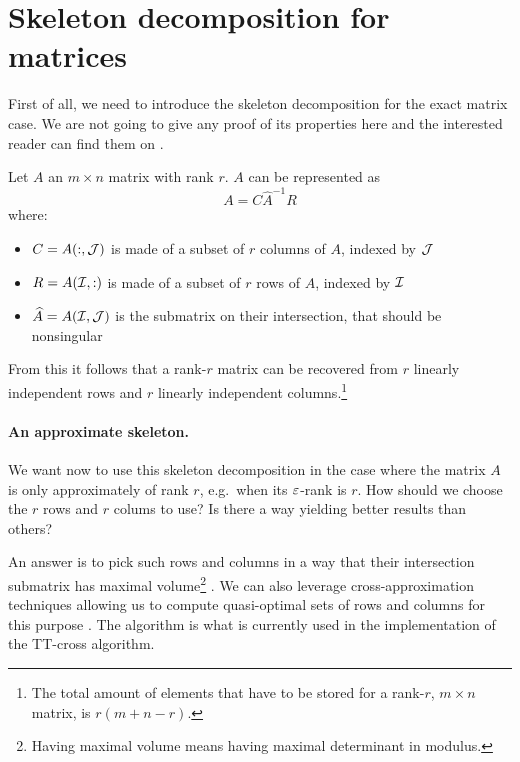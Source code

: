 \section{Skeleton decomposition for matrices}
First of all, we need to introduce the skeleton decomposition for the exact matrix case. We are not going to give any proof of its properties here and the interested reader can find them on \cite{goreinov1997theory,gantmacher1959matrix}.

\begin{Teo}
  Let $A$ an $m \times n$ matrix with rank $r$. $A$ can be represented as
  \begin{equation} \label{def:skeleton}
    A = C \hat{A}^{-1} R
  \end{equation}
  where:
  \begin{itemize}
  \item $C = A(:,\mathcal{J})$ is made of a subset of $r$ columns of $A$, indexed by $\mathcal{J}$
  \item $R = A(\mathcal{I},:)$ is made of a subset of $r$ rows of $A$, indexed by $\mathcal{I}$
  \item $\widehat{A} = A(\mathcal{I},\mathcal{J})$ is the submatrix on their intersection, that should be nonsingular
  \end{itemize}
\end{Teo}

From this it follows that a rank-$r$ matrix can be recovered from $r$ linearly independent rows and $r$ linearly independent columns.\footnote{The total amount of elements that have to be stored for a rank-$r$, $m \times n$ matrix, is $r(m+n-r)$.}

\paragraph{An approximate skeleton.}
We want now to use this skeleton decomposition in the case where the matrix $A$ is only approximately of rank $r$, e.g.\ when its $\varepsilon$-rank is $r$.
How should we choose the $r$ rows and $r$ colums to use? Is there a way yielding better results than others?

An answer is to pick such rows and columns in a way that their intersection submatrix has maximal volume\footnote{Having maximal volume means having maximal determinant in modulus.} \cite{goreinov2001maximal}. We can also leverage cross-approximation techniques allowing us to compute quasi-optimal sets of rows and columns for this purpose \cite{tyrtyshnikov2000incomplete,bebendorf2000approximation}. The  algorithm \cite{goreinov2010find} is what is currently used in the implementation of the TT-cross algorithm.

